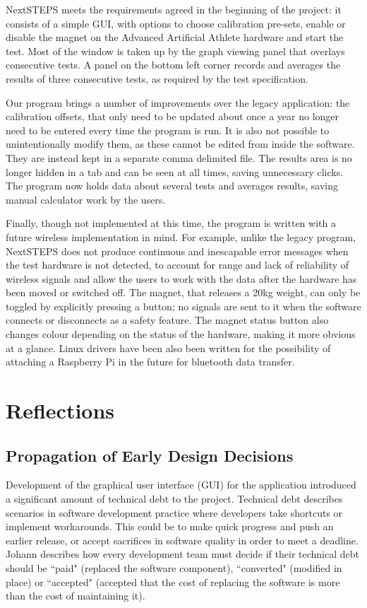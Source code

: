 \documentclass{l3proj}
\begin{document}
NextSTEPS meets the requirements agreed in the beginning of the project: it consists of a simple GUI, with options to choose calibration pre-sets, enable or disable the magnet on the Advanced Artificial Athlete hardware and start the test. Most of the window is taken up by the graph viewing panel that overlays consecutive tests. A panel on the bottom left corner records and averages the results of three consecutive tests, as required by the test specification\cite{fifa}.

Our program brings a number of improvements over the legacy application: the calibration offsets, that only need to be updated about once a year no longer need to be entered every time the program is run. It is also not possible to unintentionally modify them, as these cannot be edited from inside the software. They are instead kept in a separate comma delimited file. The results area is no longer hidden in a tab and can be seen at all times, saving unnecessary clicks. The program now holds data about several tests and averages results, saving manual calculator work by the users.

Finally, though not implemented at this time, the program is written with a future wireless implementation in mind. For example, unlike the legacy program, NextSTEPS does not produce continuous and inescapable error messages when the test hardware is not detected, to account for range and lack of reliability of wireless signals and allow the users to work with the data after the hardware has been moved or switched off. The magnet, that releases a 20kg weight, can only be toggled by explicitly pressing a button; no signals are sent to it when the software connects or disconnects as a safety feature. The magnet status button also changes colour depending on the status of the hardware, making it more obvious at a glance. Linux drivers have been also been written for the possibility of attaching a Raspberry Pi in the future for bluetooth data transfer. 
\section{Reflections}
\subsection{Propagation of Early Design Decisions}
\label{subsection:prop}
Development of the graphical user interface (GUI) for the application introduced a significant amount of technical debt to the project. Technical debt describes scenarios in software development practice where developers take shortcuts or implement workarounds\cite{yli-huumo}. This could be to make quick progress and push an earlier release\cite{kruchten}, or accept sacrifices in software quality in order to meet a deadline\cite{zazworka}. Johann describes how every development team must decide if their technical debt should be ``paid" (replaced the software component), ``converted" (modified in place) or ``accepted" (accepted that the cost of replacing the software is more than the cost of maintaining it)\cite{wolff}.
\end{document}

